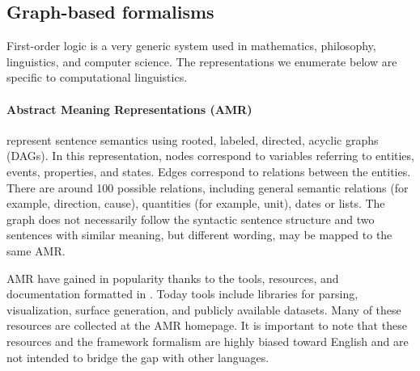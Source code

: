
\subsection{Graph-based formalisms}


First-order logic is a very generic system used in mathematics, philosophy, linguistics, and computer science. The representations we enumerate below are specific to computational linguistics.

\paragraph{Abstract Meaning Representations (AMR)} represent sentence semantics using rooted, labeled, directed, acyclic graphs (DAGs). In this representation, nodes correspond to variables referring to entities, events, properties, and states. Edges correspond to relations between the entities. There are around 100 possible relations, including general semantic relations (for example, direction, cause), quantities (for example, unit), dates or lists. The graph does not necessarily follow the syntactic sentence structure and two sentences with similar meaning, but different wording, may be mapped to the same AMR. 

AMR have gained in popularity thanks to the tools, resources, and documentation formatted in \textcite{banarescu2013abstract}. Today tools include libraries for parsing, visualization, surface generation, and publicly available datasets. Many of these resources are collected at the AMR homepage. It is important to note that these resources and the framework formalism are highly biased toward English and are not intended to bridge the gap with other languages.

